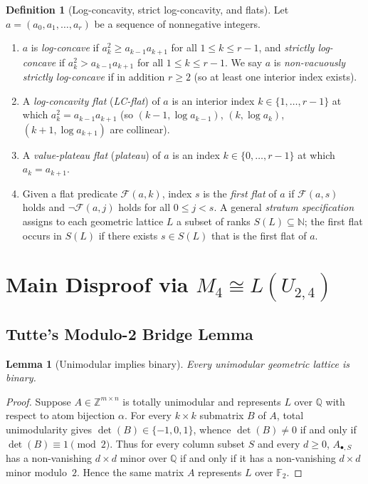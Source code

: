 \documentclass[11pt]{article}
\newtheorem{lemma}[theorem]{Lemma}
\theoremstyle{definition}
\newtheorem{definition}[theorem]{Definition}
\theoremstyle{remark}
\newcommand{\F}{\mathbb{F}}
\newcommand{\Q}{\mathbb{Q}}
\newcommand{\Z}{\mathbb{Z}}
\begin{document}
\begin{definition}[Log-concavity, strict log-concavity, and flats]
\label{def:lc-flat}
Let $a = (a_0, a_1, \dots, a_r)$ be a sequence of nonnegative integers.
\begin{enumerate}
  \item[(1)] $a$ is \emph{log-concave} if $a_k^2 \ge a_{k-1} a_{k+1}$ for all $1 \le k \le r - 1$,
    and \emph{strictly log-concave} if $a_k^2 > a_{k-1} a_{k+1}$ for all $1 \le k \le r - 1$.
    We say $a$ is \emph{non-vacuously strictly log-concave} if in addition $r \ge 2$ (so at least
    one interior index exists).
  \item[(2)] A \emph{log-concavity flat} (\emph{LC-flat}) of $a$ is an interior index
    $k \in \{1, \dots, r-1\}$ at which $a_k^2 = a_{k-1} a_{k+1}$ (so $(k-1, \log a_{k-1})$,
    $(k, \log a_k)$, $(k+1, \log a_{k+1})$ are collinear).
  \item[(3)] A \emph{value-plateau flat} (\emph{plateau}) of $a$ is an index $k \in \{0, \dots, r-1\}$
    at which $a_k = a_{k+1}$.
  \item[(4)] Given a flat predicate $\mathcal{F}(a, k)$, index $s$ is the \emph{first flat} of $a$ if
    $\mathcal{F}(a, s)$ holds and $\neg \mathcal{F}(a, j)$ holds for all $0 \le j < s$. A general
    \emph{stratum specification} assigns to each geometric lattice $L$ a subset of ranks
    $S(L) \subseteq \mathbb{N}$; the first flat occurs in $S(L)$ if there exists $s \in S(L)$
    that is the first flat of $a$.
\end{enumerate}
\end{definition}

\section{Main Disproof via \texorpdfstring{$M_4 \cong L(U_{2,4})$}{M4 = L(U(2,4))}}

\subsection{Tutte's Modulo-2 Bridge Lemma}

\begin{lemma}[Unimodular implies binary]
\label{lem:tu-binary}
Every unimodular geometric lattice is binary.
\end{lemma}

\begin{proof}
Suppose $A \in \Z^{m \times n}$ is totally unimodular and represents $L$ over $\Q$ with respect
to atom bijection $\alpha$. For every $k \times k$ submatrix $B$ of $A$, total unimodularity gives
$\det(B) \in \{-1, 0, 1\}$, whence $\det(B) \neq 0$ if and only if $\det(B) \equiv 1 \pmod{2}$.
Thus for every column subset $S$ and every $d \ge 0$, $A_{\bullet, S}$ has a non-vanishing
$d \times d$ minor over $\Q$ if and only if it has a non-vanishing $d \times d$ minor modulo~$2$.
Hence the same matrix $A$ represents $L$ over $\F_2$.
\end{proof}
\end{document}
